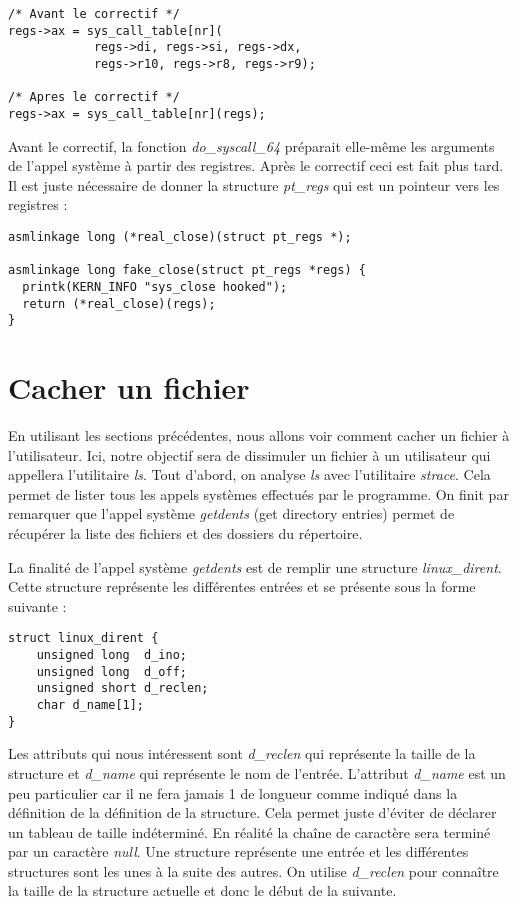 \documentclass[journal, a4paper]{IEEEtran}
\begin{document}
\begin{lstlisting}[style=CStyle]
/* Avant le correctif */
regs->ax = sys_call_table[nr](
			regs->di, regs->si, regs->dx,
			regs->r10, regs->r8, regs->r9);

/* Apres le correctif */
regs->ax = sys_call_table[nr](regs);
\end{lstlisting}
Avant le correctif, la fonction \textit{do\_syscall\_64} préparait elle-même les arguments de l'appel système à partir des registres. Après le correctif ceci est fait plus tard. Il est juste nécessaire de donner la structure \textit{pt\_regs} qui est un pointeur vers les registres :
\begin{lstlisting}[style=CStyle]
asmlinkage long (*real_close)(struct pt_regs *);

asmlinkage long fake_close(struct pt_regs *regs) {
  printk(KERN_INFO "sys_close hooked");
  return (*real_close)(regs);
}
\end{lstlisting}

\section{Cacher un fichier}

En utilisant les sections précédentes, nous allons voir comment cacher un fichier à l'utilisateur. Ici, notre objectif sera de dissimuler un fichier à un utilisateur qui appellera l'utilitaire \textit{ls}. Tout d'abord, on analyse \textit{ls} avec  l'utilitaire \textit{strace}. Cela permet de lister tous les appels systèmes effectués par le programme. On finit par remarquer que l'appel système \textit{getdents} (get directory entries) permet de récupérer la liste des fichiers et des dossiers du répertoire.

La finalité de l'appel système \textit{getdents} est de remplir une structure \textit{linux\_dirent}. Cette structure représente les différentes entrées et se présente sous la forme suivante : 
\begin{lstlisting}[style=CStyle]
 struct linux_dirent {
	unsigned long  d_ino;
	unsigned long  d_off;
	unsigned short d_reclen;
	char d_name[1]; 
}
\end{lstlisting}
Les attributs qui nous intéressent sont \textit{d\_reclen} qui représente la taille de la structure et \textit{d\_name} qui représente le nom de l'entrée. L'attribut \textit{d\_name} est un peu particulier car il ne fera jamais 1 de longueur comme indiqué dans la définition de la définition de la structure. Cela permet juste d'éviter de déclarer un tableau de taille indéterminé. En réalité la chaîne de caractère sera terminé par un caractère \textit{null}. Une structure représente une entrée et les différentes structures sont les unes à la suite des autres. On utilise \textit{d\_reclen} pour connaître la taille de la structure actuelle et donc le début de la suivante.
\end{document}
